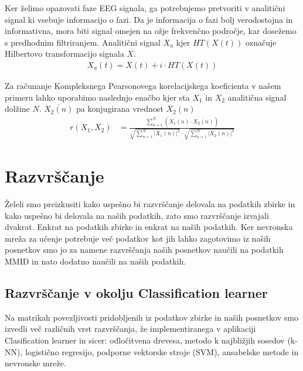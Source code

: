 Ker želimo opazovati faze EEG signala, ga potrebujemo pretvoriti v analitični signal ki vsebuje informacijo o fazi. Da je informacija o fazi bolj verodostojna in informativna, mora biti signal omejen na ožje frekvenčno področje, kar dosežemo s predhodnim filtriranjem. Analitični signal $X_a$ kjer $HT(X(t))$ označuje Hilbertovo transformacijo signala $X$.\cite{sverkoComplexPearsonCorrelation2022} 
\begin{align*}
    X_a(t) = X(t) + i \cdot HT(X(t))
\end{align*}

Za računanje Kompleksnega Pearsonovega korelacijskega koeficienta v našem primeru lahko uporabimo naslednjo enačbo kjer sta $X_1$ in $X_2$ analitična signal dolžine $N$. $\overline{X_2(n)}$ pa konjugirana vrednost $X_2(n)$\cite{sverkoComplexPearsonCorrelation2022} 
\begin{align*}
r(X_1, X_2) &= \frac{\sum\limits_{n=1}^{N}(X_1(n) \cdot \overline{X_2(n)})}{\sqrt{\sum\limits_{n=1}^{N} |X_1(n)|^2} \cdot \sqrt{\sum\limits_{n=1}^{N} |X_2(n)|^2}}
\end{align*}

\section{Razvrščanje}
Želeli smo preizkusiti kako uspešno bi razvrščanje delovala na podatkih zbirke in kako uspešno bi delovala na naših podatkih, zato smo razvrščanje izvajali dvakrat. Enkrat na podatkih zbirke in enkrat na naših podatkih. Ker nevronska mreža za učenje potrebuje več podatkov kot jih lahko zagotovimo iz naših posnetkov smo jo za namene razvrščanja naših posnetkov naučili na podatkih MMID in nato dodatno naučili na naših podatkih. 

\subsection{Razvrščanje v okolju Classification learner}
Na matrikah povezljivosti pridobljenih iz podatkov zbirke in naših posnetkov smo izvedli več različnih vrst razvrščanja, že implementiranega v aplikaciji Clasification learner in sicer: odločitvena drevesa, metodo k najbližjih sosedov (k-NN), logistično regresijo, podporne vektorske stroje (SVM), ansabelske metode in nevronske mreže.


